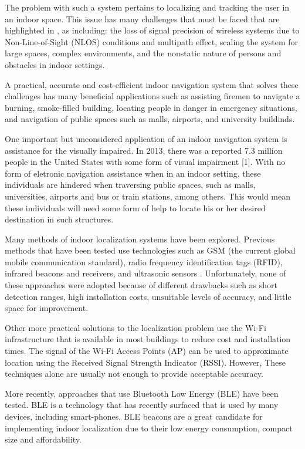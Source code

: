 \documentclass[conference]{IEEEtran}
\begin{document}
The problem with such a system pertains to localizing and tracking the user in an indoor space. This issue has many challenges that must be faced that are highlighted in \cite{mainetti2014survey}, as including: the loss of signal precision of wireless systems due to Non-Line-of-Sight (NLOS) conditions and multipath effect, scaling the system for large spaces, complex environments, and the nonstatic nature of persons and obstacles in indoor settings.

A practical, accurate and cost-efficient indoor navigation system that solves these challenges has many beneficial applications such as assisting firemen to navigate a burning, smoke-filled building, locating people in danger in emergency situations, and navigation of public spaces such as malls, airports, and university buildinds.

One important but unconsidered application of an indoor navigation system is assistance for the visually impaired. In 2013, there was a reported 7.3 million people in the United States with some form of visual impairment [1]. With no form of eletronic navigation assistance when in an indoor setting, these individuals are hindered when traversing public spaces, such as malls, universities, airports and bus or train stations, among others. This would mean these individuals will need some form of help to locate his or her desired destination in such structures.

Many methods of indoor localization systems have been explored. Previous methods that have been tested use technologies such as GSM (the current global mobile communication standard), radio frequency identification tags (RFID), infrared beacons and receivers, and ultrasonic sensors \cite{otsason2005accurate,li2011performance,liu2014survey,ward1997new,medina2013ultrasound}. Unfortunately, none of these approaches were adopted because of different drawbacks such as short detection ranges, high installation costs, unsuitable levels of accuracy, and little space for improvement.

Other more practical solutions to the localization problem use the Wi-Fi infrastructure that is available in most buildings to reduce cost and installation times. The signal of the Wi-Fi Access Points (AP) can be used to approximate location using the Received Signal Strength Indicator (RSSI). However, These techniques alone are usually not enough to provide acceptable accuracy.

More recently, approaches that use Bluetooth Low Energy (BLE) have been tested. BLE is a technology that has recently surfaced that is used by many devices, including smart-phones. BLE beacons are a great candidate for implementing indoor localization due to their low energy consumption, compact size and affordability.
\end{document}
